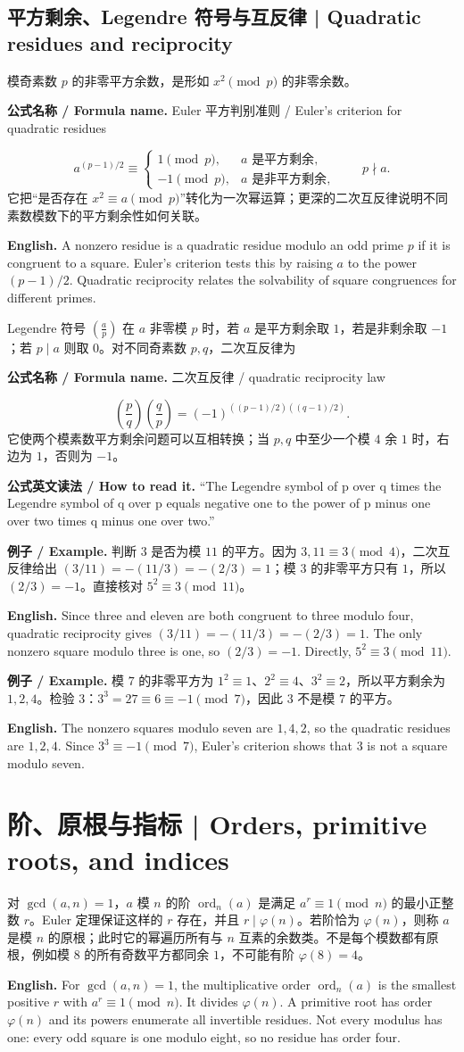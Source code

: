 \documentclass[UTF8,11pt,a4paper]{ctexart}
\newcommand{\EN}[1]{\par\noindent \textbf{English.} #1\par}
\newcommand{\FORMULA}[2]{\par\noindent\textbf{公式名称 / Formula name.} #1 / #2\par}
\newcommand{\READ}[1]{\par\noindent \textbf{公式英文读法 / How to read it.} #1\par}
\newcommand{\EX}[2]{\par\noindent \textbf{例子 / Example.} #1\par\EN{#2}}
\begin{document}
\subsection{平方剩余、Legendre 符号与互反律 | Quadratic residues and reciprocity}

\noindent 模奇素数 $p$ 的非零平方余数，是形如 $x^2\pmod p$ 的非零余数。\FORMULA{Euler 平方判别准则}{Euler's criterion for quadratic residues}
\[
a^{(p-1)/2}\equiv\begin{cases}1\pmod p,&a\text{ 是平方剩余},\\-1\pmod p,&a\text{ 是非平方剩余},\end{cases}
\qquad p\nmid a.
\]
它把“是否存在 $x^2\equiv a\pmod p$”转化为一次幂运算；更深的二次互反律说明不同素数模数下的平方剩余性如何关联。
\EN{A nonzero residue is a quadratic residue modulo an odd prime $p$ if it is congruent to a square. Euler's criterion tests this by raising $a$ to the power $(p-1)/2$. Quadratic reciprocity relates the solvability of square congruences for different primes.}
\noindent Legendre 符号 $\left(\frac ap\right)$ 在 $a$ 非零模 $p$ 时，若 $a$ 是平方剩余取 $1$，若是非剩余取 $-1$；若 $p\mid a$ 则取 $0$。对不同奇素数 $p,q$，二次互反律为
\FORMULA{二次互反律}{quadratic reciprocity law}
\[
\left(\frac pq\right)\left(\frac qp\right)=(-1)^{((p-1)/2)((q-1)/2)}.
\]
它使两个模素数平方剩余问题可以互相转换；当 $p,q$ 中至少一个模 $4$ 余 $1$ 时，右边为 $1$，否则为 $-1$。
\READ{“The Legendre symbol of p over q times the Legendre symbol of q over p equals negative one to the power of p minus one over two times q minus one over two.”}
\EX{判断 $3$ 是否为模 $11$ 的平方。因为 $3,11\equiv3\pmod4$，二次互反律给出 $(3/11)=-(11/3)=-(2/3)=1$；模 $3$ 的非零平方只有 $1$，所以 $(2/3)=-1$。直接核对 $5^2\equiv3\pmod{11}$。}{Since three and eleven are both congruent to three modulo four, quadratic reciprocity gives $(3/11)=-(11/3)=-(2/3)=1$. The only nonzero square modulo three is one, so $(2/3)=-1$. Directly, $5^2\equiv3\pmod{11}$.}

\EX{模 $7$ 的非零平方为 $1^2\equiv1$、$2^2\equiv4$、$3^2\equiv2$，所以平方剩余为 $1,2,4$。检验 $3$：$3^3=27\equiv6\equiv-1\pmod7$，因此 $3$ 不是模 $7$ 的平方。}{The nonzero squares modulo seven are $1,4,2$, so the quadratic residues are $1,2,4$. Since $3^3\equiv-1\pmod7$, Euler's criterion shows that $3$ is not a square modulo seven.}

\section{阶、原根与指标 | Orders, primitive roots, and indices}
\noindent 对 $\gcd(a,n)=1$，$a$ 模 $n$ 的阶 $\operatorname{ord}_n(a)$ 是满足 $a^r\equiv1\pmod n$ 的最小正整数 $r$。Euler 定理保证这样的 $r$ 存在，并且 $r\mid\varphi(n)$。若阶恰为 $\varphi(n)$，则称 $a$ 是模 $n$ 的原根；此时它的幂遍历所有与 $n$ 互素的余数类。不是每个模数都有原根，例如模 $8$ 的所有奇数平方都同余 $1$，不可能有阶 $\varphi(8)=4$。
\EN{For $\gcd(a,n)=1$, the multiplicative order $\operatorname{ord}_n(a)$ is the smallest positive $r$ with $a^r\equiv1\pmod n$. It divides $\varphi(n)$. A primitive root has order $\varphi(n)$ and its powers enumerate all invertible residues. Not every modulus has one: every odd square is one modulo eight, so no residue has order four.}
\end{document}
